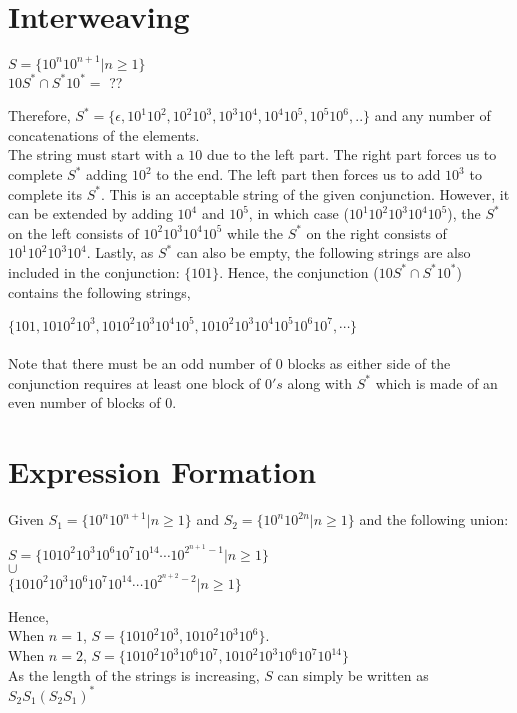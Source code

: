 \documentclass[11pt,letterpaper]{article}
\begin{document}
\section{Interweaving}
\begin{center}
    $S = \{10^{n}10^{n+1}|n \geq 1\}$
    \\
    $10S^{*} \cap S^{*}10^{*} =$ ??
\end{center}
Therefore, $S^{*} = \{\epsilon, 10^{1}10^{2}, 10^{2}10^{3}, 10^{3}10^{4}, 10^{4}10^{5}, 10^{5}10^{6}, ..\}$ and any number of concatenations of the elements.
\\
The string must start with a $10$ due to the left part. The right part forces us to complete $S^*$ adding $10^{2}$ to the end. The left part then forces us to add $10^{3}$ to complete its $S^*$. This is an acceptable string of the given conjunction. However, it can be extended by adding $10^{4}$ and $10^{5}$, in which case ($10^{1}10^{2}10^{3}10^{4}10^{5}$), the $S^*$ on the left consists of $10^{2}10^{3}10^{4}10^{5}$ while the $S^*$ on the right consists of $10^{1}10^{2}10^{3}10^{4}$. Lastly, as $S^*$ can also be empty, the following strings are also included in the conjunction: $\{101\}$. Hence, the conjunction ($10S^{*} \cap S^{*}10^{*}$) contains the following strings,
\begin{center}
    $\{101, 1010^{2}10^{3}, 1010^{2}10^{3}10^{4}10^{5}, 1010^{2}10^{3}10^{4}10^{5}10^{6}10^{7}, \cdots\}$
\end{center}
\paragraph{}
\small Note that there must be an odd number of $0$ blocks as either side of the conjunction requires at least one block of $0's$ along with $S^*$ which is made of an even number of blocks of $0$.

\section{Expression Formation}
Given $S_1 = \{ 10^{n}10^{n+1} | n \geq 1 \}$ and $S_2 = \{ 10^{n}10^{2n} | n \geq 1 \}$ and the following union:
\begin{center}
    $S = \{1010^{2}10^{3}10^{6}10^{7}10^{14}\cdots10^{2^{n+1}-1} | n \geq 1 \}$ \\
    $\cup$ \\
    $\{1010^{2}10^{3}10^{6}10^{7}10^{14}\cdots10^{2^{n+2}-2} | n \geq 1 \}$
\end{center}
Hence, \\
When $n=1$, $S = \{1010^{2}10^{3}, 1010^{2}10^{3}10^{6}\}$.\\ When $n=2$, $S = \{1010^{2}10^{3}10^{6}10^{7}, 1010^{2}10^{3}10^{6}10^{7}10^{14}\}$ \\
As the length of the strings is increasing, $S$ can simply be written as $S_2S_1(S_2S_1)^*$
\end{document}
